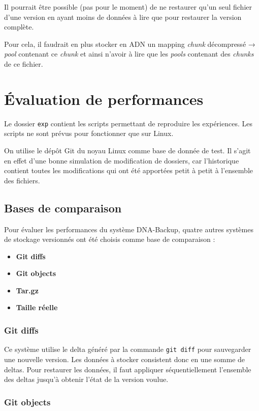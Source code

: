 \documentclass[a4paper,twocolumn]{article}
\begin{document}
Il pourrait être possible (pas pour le moment) de ne restaurer qu'un
seul fichier d'une version en ayant moins de données à lire que pour
restaurer la version complète.

Pour cela, il faudrait en plus stocker en ADN un mapping \emph{chunk}
décompressé → \emph{pool} contenant ce \emph{chunk} et ainsi n'avoir à
lire que les \emph{pools} contenant des \emph{chunks} de ce fichier.

\section{Évaluation de performances}

Le dossier \verb|exp| contient les scripts permettant de reproduire
les expériences. Les scripts ne sont prévus pour fonctionner que sur
Linux.

On utilise le dépôt Git du noyau Linux comme base de donnée de test. Il
s'agit en effet d'une bonne simulation de modification de dossiers, car
l'historique contient toutes les modifications qui ont été apportées
petit à petit à l'ensemble des fichiers.

\subsection{Bases de comparaison}

Pour évaluer les performances du système DNA-Backup, quatre autres
systèmes de stockage versionnés ont été choisis comme base de
comparaison :

\begin{itemize}
\item
  \textbf{Git diffs}
\item
  \textbf{Git objects}
\item
  \textbf{Tar.gz}
\item
  \textbf{Taille réelle}
\end{itemize}

\subsubsection{Git diffs}

Ce système utilise le delta généré par la commande \verb|git diff|
pour sauvegarder une nouvelle version. Les données à stocker consistent
donc en une somme de deltas. Pour restaurer les données, il faut
appliquer séquentiellement l'ensemble des deltas jusqu'à obtenir l'état
de la version voulue.

\subsubsection{Git objects}
\end{document}
